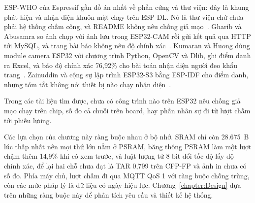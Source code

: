 \documentclass[../DoAn.tex]{subfiles}
\begin{document}
ESP-WHO của Espressif gần đồ án nhất về phần cứng và thư viện: đây là khung phát
hiện và nhận diện khuôn mặt chạy trên ESP-DL. Nó là thư viện chứ chưa phải hệ thống
chấm công, và README không nêu chống giả mạo~\cite{espwho}. Gharib và Abusamra so
ảnh chụp với ảnh lưu trong ESP32-CAM rồi gửi kết quả qua HTTP tới MySQL, và trang
bài báo không nêu độ chính xác~\cite{gharib2024}. Kumaran và Huong dùng module
camera ESP32 với chương trình Python, OpenCV và Dlib, ghi điểm danh ra Excel, và báo
độ chính xác 76,92\% cho bài toán nhận diện người đeo khẩu trang~\cite{kumaran2023}.
Zainuddin và cộng sự lập trình ESP32-S3 bằng ESP-IDF cho điểm danh, nhưng tóm tắt
không nói thiết bị nào chạy nhận diện~\cite{zainuddin2024}.

Trong các tài liệu tìm được, chưa có công trình nào trên ESP32 nêu chống giả mạo
chạy trên chip, số đo cả chuỗi trên board, hay phần nhân sự đi từ lượt chấm tới
phiếu lương.

Các lựa chọn của chương này ràng buộc nhau ở bộ nhớ. SRAM chỉ còn 28.675~B lúc
thấp nhất nên mọi thứ lớn nằm ở PSRAM, băng thông PSRAM làm một lượt chậm thêm
14,9\% khi có xem trước, và luật lượng tử 8 bit đổi tốc độ lấy độ chính xác, để lại
hai chỗ chưa đạt là TAR 0,799 trên CFP-FP và ảnh in chưa có số đo. Phía máy chủ,
lượt chấm đi qua MQTT QoS 1 với ràng buộc chống trùng, còn các mức pháp lý là dữ
liệu có ngày hiệu lực. Chương~\ref{chapter:Design} dựa trên những ràng buộc này để
phân tích yêu cầu và thiết kế hệ thống.
\end{document}
